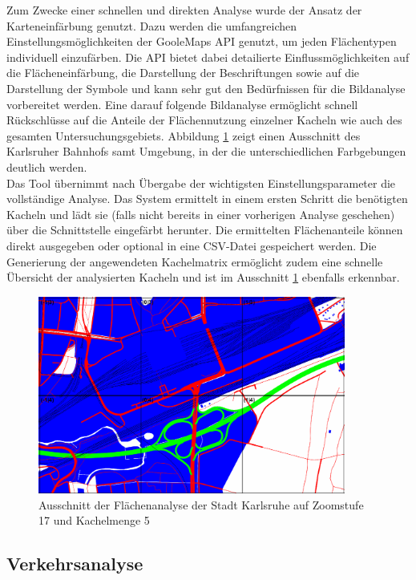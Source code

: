Zum Zwecke einer schnellen und direkten Analyse wurde der Ansatz der Karteneinfärbung genutzt. Dazu werden die umfangreichen Einstellungsmöglichkeiten der GooleMaps API genutzt, um jeden Flächentypen individuell einzufärben. Die API bietet dabei detailierte Einflussmöglichkeiten auf die Flächeneinfärbung, die Darstellung der Beschriftungen sowie auf die Darstellung der Symbole und kann sehr gut den Bedürfnissen für die Bildanalyse vorbereitet werden. Eine darauf folgende Bildanalyse ermöglicht schnell Rückschlüsse auf die Anteile der Flächennutzung einzelner Kacheln wie auch des gesamten Untersuchungsgebiets. Abbildung \ref{fig:ka_area_analysis} zeigt einen Ausschnitt des Karlsruher Bahnhofs samt Umgebung, in der die unterschiedlichen Farbgebungen deutlich werden.\\

Das Tool übernimmt nach Übergabe der wichtigsten Einstellungsparameter die vollständige Analyse. Das System ermittelt in einem ersten Schritt die benötigten Kacheln und lädt sie (falls nicht bereits in einer vorherigen Analyse geschehen) über die Schnittstelle eingefärbt herunter. Die ermittelten Flächenanteile können direkt ausgegeben oder optional in eine CSV-Datei gespeichert werden. Die Generierung der angewendeten Kachelmatrix ermöglicht zudem eine schnelle Übersicht der analysierten Kacheln und ist im Ausschnitt \ref{fig:ka_area_analysis} ebenfalls erkennbar.

\begin{figure}
  \centering
    \includegraphics[width=0.9\textwidth]{images/karlsruhe_area_analysis_ausschnitt.png}
    \caption{Ausschnitt der Flächenanalyse der Stadt Karlsruhe auf Zoomstufe 17 und Kachelmenge 5}
    \label{fig:ka_area_analysis}
\end{figure}

\subsection{Verkehrsanalyse}
\label{sec:traffic-analysis}

